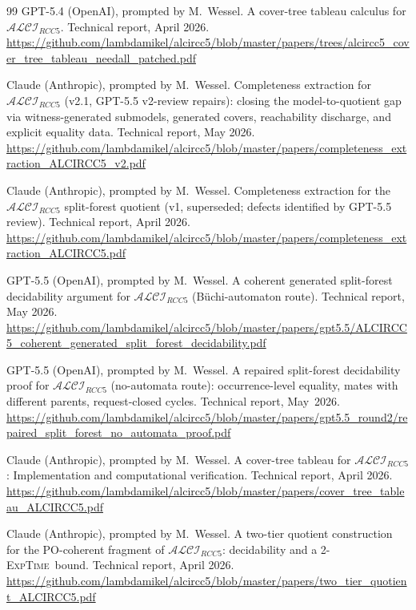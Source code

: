 \documentclass[
]{ceurart}
\theoremstyle{definition}
\newcommand{\ALCIRCC}[1]{\ensuremath{\mathcal{ALCI}_{\mathit{RCC#1}}}}
\newcommand{\EXPTIME}{\textsc{ExpTime}}
\begin{document}
\begin{thebibliography}{99}
GPT-5.4 (OpenAI), prompted by M.\ Wessel.
\newblock A cover-tree tableau calculus for $\ALCIRCC{5}$.
\newblock Technical report, April 2026.
\newblock \url{https://github.com/lambdamikel/alcircc5/blob/master/papers/trees/alcircc5_cover_tree_tableau_needall_patched.pdf}

Claude (Anthropic), prompted by M.\ Wessel.
\newblock Completeness extraction for $\ALCIRCC{5}$ (v2.1,
  GPT-5.5 v2-review repairs): closing the model-to-quotient gap via
  witness-generated submodels, generated covers, reachability
  discharge, and explicit equality data.
\newblock Technical report, May 2026.
\newblock \url{https://github.com/lambdamikel/alcircc5/blob/master/papers/completeness_extraction_ALCIRCC5_v2.pdf}

Claude (Anthropic), prompted by M.\ Wessel.
\newblock Completeness extraction for the $\ALCIRCC{5}$ split-forest
  quotient (v1, superseded; defects identified by GPT-5.5 review).
\newblock Technical report, April 2026.
\newblock \url{https://github.com/lambdamikel/alcircc5/blob/master/papers/completeness_extraction_ALCIRCC5.pdf}

GPT-5.5 (OpenAI), prompted by M.\ Wessel.
\newblock A coherent generated split-forest decidability argument
  for $\ALCIRCC{5}$ (B\"uchi-automaton route).
\newblock Technical report, May 2026.
\newblock \url{https://github.com/lambdamikel/alcircc5/blob/master/papers/gpt5.5/ALCIRCC5_coherent_generated_split_forest_decidability.pdf}

GPT-5.5 (OpenAI), prompted by M.\ Wessel.
\newblock A repaired split-forest decidability proof for
  $\ALCIRCC{5}$ (no-automata route): occurrence-level equality,
  mates with different parents, request-closed cycles.
\newblock Technical report, May~2026.
\newblock \url{https://github.com/lambdamikel/alcircc5/blob/master/papers/gpt5.5_round2/repaired_split_forest_no_automata_proof.pdf}

Claude (Anthropic), prompted by M.\ Wessel.
\newblock A cover-tree tableau for $\ALCIRCC{5}$:
  Implementation and computational verification.
\newblock Technical report, April 2026.
\newblock \url{https://github.com/lambdamikel/alcircc5/blob/master/papers/cover_tree_tableau_ALCIRCC5.pdf}

Claude (Anthropic), prompted by M.\ Wessel.
\newblock A two-tier quotient construction for the PO-coherent
  fragment of $\ALCIRCC{5}$: decidability and a 2-\EXPTIME\ bound.
\newblock Technical report, April 2026.
\newblock \url{https://github.com/lambdamikel/alcircc5/blob/master/papers/two_tier_quotient_ALCIRCC5.pdf}


\end{thebibliography}
\end{document}
